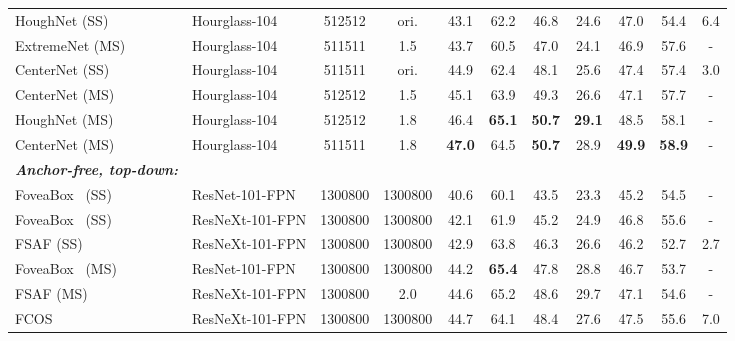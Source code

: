 \documentclass{bmvc2k}
\begin{document}
\begin{table}[H]
{\begin{tabular}{llccccccccc}
HoughNet (SS)~\cite{houghnet} & Hourglass-104 &   512512 &  ori. & 43.1 & 62.2 & 46.8 &  24.6 & 47.0 & 54.4  & 6.4 \\


ExtremeNet (MS)~\cite{extremenet} & Hourglass-104 &  511511 & 1.5 & 43.7 & 60.5 & 47.0 & 24.1 & 46.9 & 57.6  & - \\
CenterNet (SS)~\cite{triplet} & Hourglass-104 &  511511 & ori. & 44.9 & 62.4 & 48.1 & 25.6 &  47.4 & 57.4 & 3.0  \\
CenterNet (MS)~\cite{centernet} & Hourglass-104 &   512512 & 1.5 & 45.1 & 63.9 & 49.3 &  26.6 & 47.1 & 57.7  & - \\
HoughNet (MS)~\cite{houghnet} & Hourglass-104 &   512512 & 1.8 & 46.4 & \textbf{65.1} & \textbf{50.7} &  \textbf{29.1} & 48.5 & 58.1  & - \\
CenterNet (MS)~\cite{triplet} & Hourglass-104 & 511511 & 1.8 &  \textbf{47.0} &  64.5 &  \textbf{50.7} & 28.9 &   \textbf{49.9} &  \textbf{58.9}  & - \\


\textbf{\textit{Anchor-free, top-down:}} & & & & & & & & & & \\
FoveaBox~\cite{foveabox} (SS)  &  ResNet-101-FPN & 1300800 & 1300800 & 40.6 & 60.1 & 43.5 & 23.3 & 45.2 & 54.5 & - \\
FoveaBox~\cite{foveabox} (SS) &  ResNeXt-101-FPN & 1300800 & 1300800 & 42.1 & 61.9 & 45.2 &  24.9 &  46.8 &  55.6 & - \\
FSAF (SS)~\cite{fsaf} & ResNeXt-101-FPN &  1300800 & 1300800 &   42.9  &  63.8 &  46.3 &  26.6 &  46.2  &  52.7 &  2.7 \\
FoveaBox~\cite{foveabox} (MS) &  ResNet-101-FPN & 1300800 & 1300800 & 44.2 & \textbf{65.4} & 47.8 &  28.8 &  46.7 &  53.7 & - \\
FSAF (MS)~\cite{fsaf} &ResNeXt-101-FPN &   1300800 & 2.0 &   44.6 &  65.2 &  48.6 &  29.7 &  47.1  &  54.6 &  - \\
FCOS~\cite{fcos}  & ResNeXt-101-FPN  &   1300800 & 1300800 & 44.7 & 64.1 &  48.4 &  27.6 &  47.5 &    55.6 & 7.0  \\



\end{tabular}}
\end{table}
\end{document}
